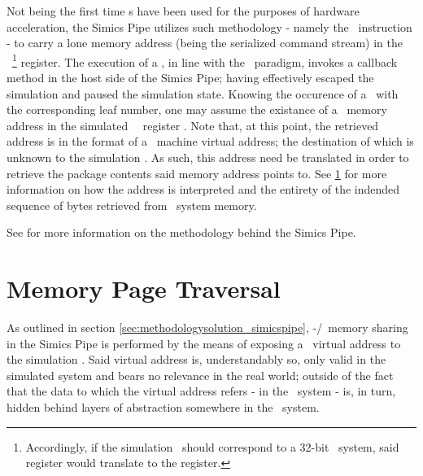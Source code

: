 Not being the first time \dvttermmagicinstruction s have been used for the purposes of hardware acceleration, the Simics Pipe utilizes such methodology - namely the  \dvttermxeightysix\ instruction - to carry a lone memory address (being the serialized command stream) in the \dvttermtarget\ \footnote{Accordingly, if the simulation \dvttermtarget\ should correspond to a 32-bit \dvttermxeightysix\ system, said register would translate to the  register.} register.
The execution of a \dvttermmagicinstruction , in line with the \dvttermmagicinstruction\ paradigm, invokes a callback method in the host side of the Simics Pipe; having effectively escaped the simulation and paused the simulation state.
Knowing the occurence of a \dvttermmagicinstruction\ with the corresponding leaf number, one may assume the existance of a \dvttermtarget\ memory address in the simulated \dvttermtarget\ \dvttermcpu\ register .
Note that, at this point, the retrieved address is in the format of a \dvttermtarget\ machine virtual address; the destination of which is unknown to the simulation \dvttermhost .
As such, this address need be translated in order to retrieve the package contents said memory address points to.
See \ref{sec:methodologysolution_memorypagetraversal} for more information on how the address is interpreted and the entirety of the indended sequence of bytes retrieved from \dvttermhost\ system memory.

See  for more information on the methodology behind the Simics Pipe.


\section{Memory Page Traversal}
\label{sec:methodologysolution_memorypagetraversal}
As outlined in section \ref{sec:methodologysolution_simicspipe}, \dvttermtarget -/\dvttermhost\ memory sharing in the Simics Pipe is performed by the means of exposing a \dvttermtarget\ virtual address to the simulation \dvttermhost .
Said virtual address is, understandably so, only valid in the simulated system and bears no relevance in the real world; outside of the fact that the data to which the virtual address refers - in the \dvttermtarget\ system - is, in turn, hidden behind layers of abstraction somewhere in the \dvttermhost\ system.

